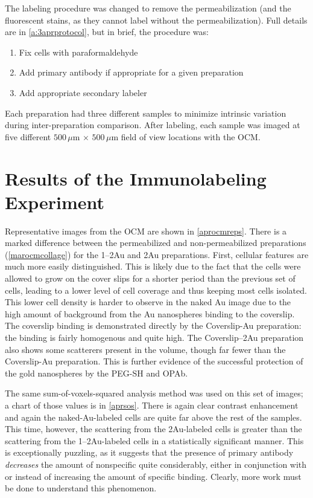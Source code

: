 The labeling procedure was changed to remove the permeabilization (and the fluorescent stains, as they cannot label without the permeabilization). Full details are in \autoref{a:3aprprotocol}, but in brief, the procedure was:

\begin{enumerate}
\item Fix cells with paraformaldehyde

\item Add primary antibody if appropriate for a given preparation

\item Add appropriate secondary labeler

\end{enumerate}

Each preparation had three different samples to minimize intrinsic variation during inter-preparation comparison. After labeling, each sample was imaged at five different $500\,\mu\mathrm{m}\,\times\,500\,\mu\mathrm{m}$ field of view locations with the OCM.

\section{Results of the Immunolabeling Experiment}
\label{resultsoftheimmunolabelingexperiment}

Representative images from the OCM are shown in \autoref{aprocmreps}. There is a marked difference between the permeabilized and non-permeabilized preparations (\autoref{marocmcollage}) for the 1--2Au and 2Au preparations. First, cellular features are much more easily distinguished. This is likely due to the fact that the cells were allowed to grow on the cover slips for a shorter period than the previous set of cells, leading to a lower level of cell coverage and thus keeping most cells isolated. This lower cell density is harder to observe in the naked Au image due to the high amount of background from the Au nanospheres binding to the coverslip. The coverslip binding is demonstrated directly by the Coverslip-Au preparation: the binding is fairly homogenous and quite high. The Coverslip--2Au preparation also shows some scatterers present in the volume, though far fewer than the Coverslip-Au preparation. This is further evidence of the successful protection of the gold nanospheres by the PEG-SH and OPAb.

The same sum-of-voxels-squared analysis method was used on this set of images; a chart of those values is in \autoref{aprsos}. There is again clear contrast enhancement and again the naked-Au-labeled cells are quite far above the rest of the samples. This time, however, the scattering from the 2Au-labeled cells is greater than the scattering from the 1--2Au-labeled cells in a statistically significant manner. This is exceptionally puzzling, as it suggests that the presence of primary antibody \emph{decreases} the amount of nonspecific quite considerably, either in conjunction with or instead of increasing the amount of specific binding. Clearly, more work must be done to understand this phenomenon.

